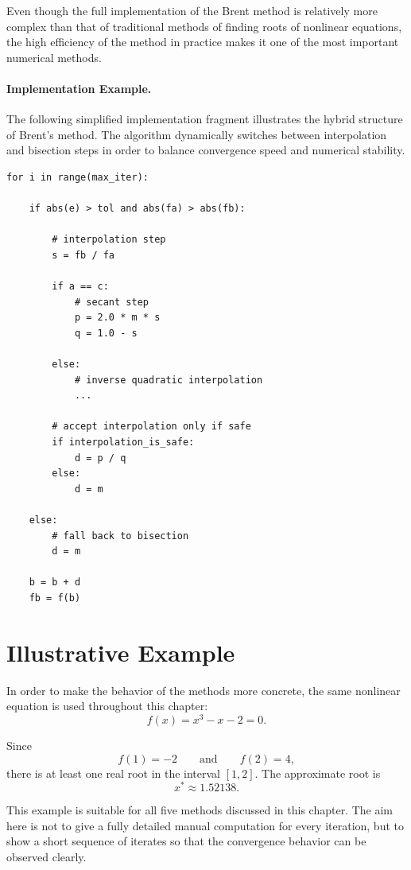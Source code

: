 Even though the full implementation of the Brent method is relatively more complex than that of traditional methods of finding roots of nonlinear equations, the high efficiency of the method in practice makes it one of the most important numerical methods.

\paragraph{Implementation Example.}

The following simplified implementation fragment illustrates the hybrid structure of Brent's method. The algorithm dynamically switches between interpolation and bisection steps in order to balance convergence speed and numerical stability.

\begin{lstlisting}
for i in range(max_iter):

    if abs(e) > tol and abs(fa) > abs(fb):

        # interpolation step
        s = fb / fa

        if a == c:
            # secant step
            p = 2.0 * m * s
            q = 1.0 - s

        else:
            # inverse quadratic interpolation
            ...

        # accept interpolation only if safe
        if interpolation_is_safe:
            d = p / q
        else:
            d = m

    else:
        # fall back to bisection
        d = m

    b = b + d
    fb = f(b)
\end{lstlisting}

\section{Illustrative Example}

In order to make the behavior of the methods more concrete, the same nonlinear equation is used throughout this chapter:
\begin{equation}
f(x)=x^3-x-2=0.
\end{equation}

Since
\[
f(1)=-2 \qquad \text{and} \qquad f(2)=4,
\]
there is at least one real root in the interval \([1,2]\). The approximate root is
\[
x^* \approx 1.52138.
\]

This example is suitable for all five methods discussed in this chapter. The aim here is not to give a fully detailed manual computation for every iteration, but to show a short sequence of iterates so that the convergence behavior can be observed clearly.

